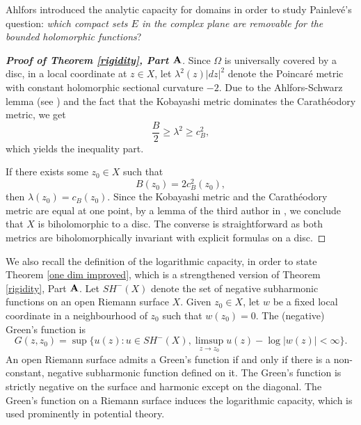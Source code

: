 \documentclass[12pt] {article}
\numberwithin{equation}{section}
\begin{document}
  Ahlfors introduced the analytic capacity for domains in order to study Painlev\'{e}'s question: \textit{which compact sets $E$ in the complex plane are removable for the bounded holomorphic functions}?


\medskip
 




\begin{proof} [{\bf Proof of Theorem \ref{rigidity}, Part {$\bf A$}}]

Since $\Omega$ is universally
 covered by a disc,
in a local coordinate at $z \in X$, let
$
\lambda^2(z) |dz|^2
$
denote the Poincar\'e metric with constant  holomorphic sectional  curvature \(-2\).
Due to the  Ahlfors-Schwarz lemma  (see \cite{Ahlfors, Roy, Yau78}) and the fact that the Kobayashi metric dominates the Carath\'eodory metric, we get 
$$ 
\frac{B}{2} \geq \lambda^2  \geq c^2_B,
$$
which yields the inequality part.


 

\medskip


If there exists some $z_0 \in X$ such that 
$$
B(z_0) =  2 c^2_B(z_0),
$$
then $\lambda (z_0) = c_B(z_0)$.
Since the Kobayashi metric and the Carath\'eodory metric are equal at one point,
by a lemma of the third author in  \cite{Wo}, we conclude that $X$ is biholomorphic to a disc.
  The converse is straightforward as both metrics are biholomorphically invariant with explicit formulas on a disc.

 


\end{proof}


 

\medskip


We also recall the definition of  the logarithmic   capacity, in order to  state  Theorem \ref{one dim improved}, which is a strengthened version of Theorem \ref{rigidity}, Part {$\bf A$}.
Let $SH^{-}(X)$ denote the set of negative subharmonic functions on an open Riemann surface $X$. Given   $z_0 \in X$,  let $w$ be  a fixed local coordinate  in a neighbourhood of $z_0$ such that $w(z_0) =0$. The (negative) Green's function   is
 $$
G(z, z_0) = \sup\{u(z): u \in SH^{-}(X), \limsup_{z \to z_0} u(z) - \log|w(z)| < \infty\}.
 $$
 An open Riemann surface admits a Green's function if and only if there is a non-constant, negative subharmonic function defined on it.  The Green's function is strictly negative on the surface and harmonic except on the diagonal. The Green's function  on a Riemann surface induces the logarithmic capacity, which is used prominently in potential theory. 
\end{document}
